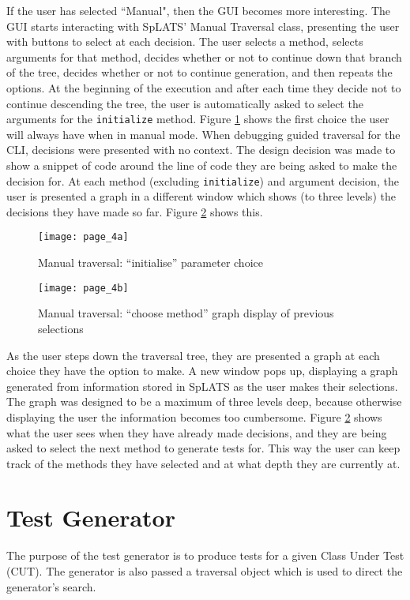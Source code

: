   If the user has selected ``Manual", then the GUI becomes more interesting. The GUI starts interacting with SpLATS' Manual Traversal class, presenting the user with buttons to select at each decision. The user selects a method, selects arguments for that method, decides whether or not to continue down that branch of the tree, decides whether or not to continue generation, and then repeats the options. At the beginning of the execution and after each time they decide not to continue descending the tree, the user is automatically asked to select the arguments for the \texttt{initialize} method. Figure \ref{fig:GUI_Page4a} shows the first choice the user will always have when in manual mode. When debugging guided traversal for the CLI, decisions were presented with no context. The design decision was made to show a snippet of code around the line of code they are being asked to make the decision for. At each method (excluding \texttt{initialize}) and argument decision, the user is presented a graph in a different window which shows (to three levels) the decisions they have made so far. Figure \ref{fig:GUI_Page4b} shows this.
  
  \begin{figure}
    \centering
    \texttt{[image: page\_4a]}
    \caption{Manual traversal: ``initialise'' parameter choice}
    \label{fig:GUI_Page4a}
  \end{figure}
  
  \begin{figure}
    \centering
    \texttt{[image: page\_4b]}
    \caption{Manual traversal: ``choose method'' graph display of previous selections}
    \label{fig:GUI_Page4b}
  \end{figure}
  
  As the user steps down the traversal tree, they are presented a graph at each choice they have the option to make. A new window pops up, displaying a graph generated from information stored in SpLATS as the user makes their selections. The graph was designed to be a maximum of three levels deep, because otherwise displaying the user the information becomes too cumbersome. Figure \ref{fig:GUI_Page4b} shows what the user sees when they have already made decisions, and they are being asked to select the next method to generate tests for. This way the user can keep track of the methods they have selected and at what depth they are currently at.

  \section{Test Generator}
    The purpose of the test generator is to produce tests for a given Class
Under Test (CUT). The generator is also passed a traversal object which is used
to direct the generator's search.

